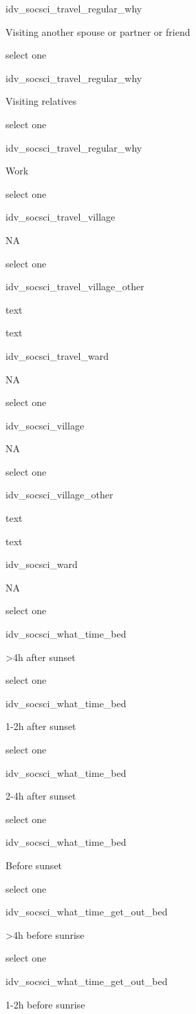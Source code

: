 \documentclass[]{article}
\begin{document}
idv\_socsci\_travel\_regular\_why

Visiting another spouse or partner or friend

select one

idv\_socsci\_travel\_regular\_why

Visiting relatives

select one

idv\_socsci\_travel\_regular\_why

Work

select one

idv\_socsci\_travel\_village

NA

select one

idv\_socsci\_travel\_village\_other

text

text

idv\_socsci\_travel\_ward

NA

select one

idv\_socsci\_village

NA

select one

idv\_socsci\_village\_other

text

text

idv\_socsci\_ward

NA

select one

idv\_socsci\_what\_time\_bed

\textgreater{}4h after sunset

select one

idv\_socsci\_what\_time\_bed

1-2h after sunset

select one

idv\_socsci\_what\_time\_bed

2-4h after sunset

select one

idv\_socsci\_what\_time\_bed

Before sunset

select one

idv\_socsci\_what\_time\_get\_out\_bed

\textgreater{}4h before sunrise

select one

idv\_socsci\_what\_time\_get\_out\_bed

1-2h before sunrise
\end{document}
